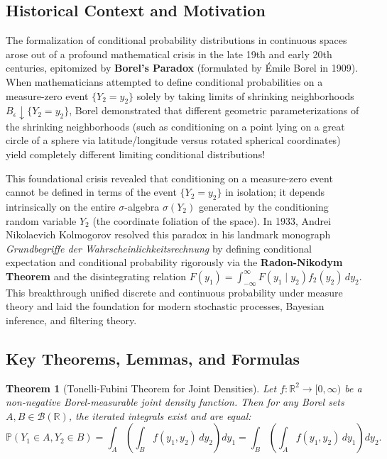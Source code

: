 \documentclass[11pt, letterpaper]{article}
\newtheorem{theorem}{Theorem}[section]
\theoremstyle{definition}
\theoremstyle{remark}
\newcommand{\Prob}{\mathbb{P}}
\begin{document}
\subsection{Historical Context and Motivation}

The formalization of conditional probability distributions in continuous spaces arose out of a profound mathematical crisis in the late 19th and early 20th centuries, epitomized by \textbf{Borel's Paradox} (formulated by \'Emile Borel in 1909). When mathematicians attempted to define conditional probabilities on a measure-zero event $\{Y_2 = y_2\}$ solely by taking limits of shrinking neighborhoods $B_\epsilon \downarrow \{Y_2 = y_2\}$, Borel demonstrated that different geometric parameterizations of the shrinking neighborhoods (such as conditioning on a point lying on a great circle of a sphere via latitude/longitude versus rotated spherical coordinates) yield completely different limiting conditional distributions!

This foundational crisis revealed that conditioning on a measure-zero event cannot be defined in terms of the event $\{Y_2 = y_2\}$ in isolation; it depends intrinsically on the entire $\sigma$-algebra $\sigma(Y_2)$ generated by the conditioning random variable $Y_2$ (the coordinate foliation of the space). In 1933, Andrei Nikolaevich Kolmogorov resolved this paradox in his landmark monograph \textit{Grundbegriffe der Wahrscheinlichkeitsrechnung} by defining conditional expectation and conditional probability rigorously via the \textbf{Radon-Nikodym Theorem} and the disintegrating relation $F(y_1) = \int_{-\infty}^\infty F(y_1 \mid y_2) f_2(y_2) \, dy_2$. This breakthrough unified discrete and continuous probability under measure theory and laid the foundation for modern stochastic processes, Bayesian inference, and filtering theory.

\subsection{Key Theorems, Lemmas, and Formulas}

\begin{theorem}[Tonelli-Fubini Theorem for Joint Densities]
Let $f : \mathbb{R}^2 \to [0, \infty)$ be a non-negative Borel-measurable joint density function. Then for any Borel sets $A, B \in \mathcal{B}(\mathbb{R})$, the iterated integrals exist and are equal:
\[ \Prob(Y_1 \in A, Y_2 \in B) = \int_A \left(\int_B f(y_1, y_2) \, dy_2\right) dy_1 = \int_B \left(\int_A f(y_1, y_2) \, dy_1\right) dy_2. \]
\end{theorem}
\end{document}

